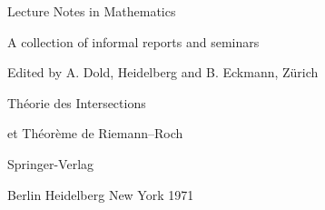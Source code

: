 \begin{center}
{\Large Lecture Notes in Mathematics}\par
A collection of informal reports and seminars\par
Edited by A. Dold, Heidelberg and B. Eckmann, Zürich\par
{}\par
\bigskip
{\Large Théorie des Intersections\par
et Théorème de Riemann--Roch}\par
\bigskip
Springer-Verlag\par
Berlin \textperiodcentered{} Heidelberg \textperiodcentered{} New York 1971
\end{center}

